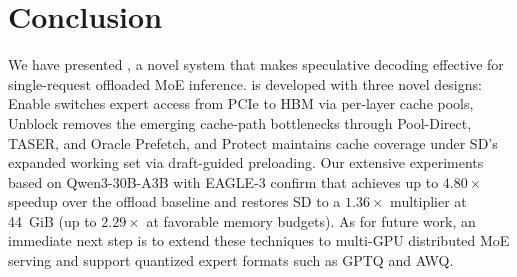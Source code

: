 \section{Conclusion}
\label{sec:conclusion}

We have presented \sysname, a novel system that makes speculative decoding effective for single-request offloaded MoE inference. \sysname is developed with three novel designs: Enable switches expert access from PCIe to HBM via per-layer cache pools, Unblock removes the emerging cache-path bottlenecks through Pool-Direct, TASER, and Oracle Prefetch, and Protect maintains cache coverage under SD's expanded working set via draft-guided preloading. Our extensive experiments based on Qwen3-30B-A3B with EAGLE-3 confirm that \sysname achieves up to $4.80\times$ speedup over the offload baseline and restores SD to a $1.36\times$ multiplier at 44~GiB (up to $2.29\times$ at favorable memory budgets). As for future work, an immediate next step is to extend these techniques to multi-GPU distributed MoE serving and support quantized expert formats such as GPTQ and AWQ.